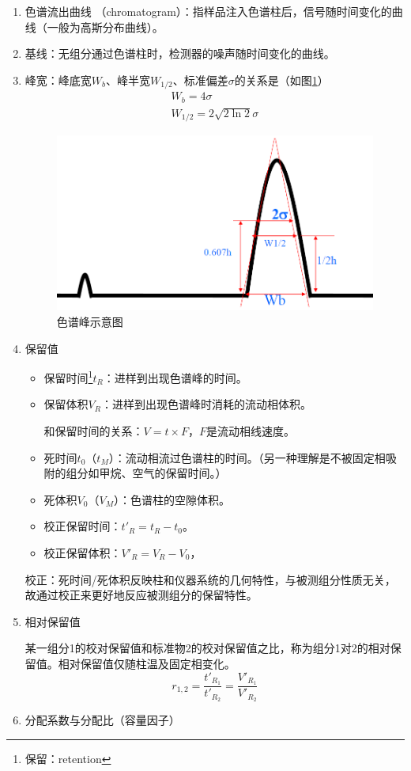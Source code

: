 \begin{enumerate}
	\item 色谱流出曲线 （chromatogram）：指样品注入色谱柱后，信号随时间变化的曲线（一般为高斯分布曲线）。
	\item 基线：无组分通过色谱柱时，检测器的噪声随时间变化的曲线。
	\item 峰宽：峰底宽$W_b$、峰半宽$W_{1/2}$、标准偏差$\sigma$的关系是（如图\ref{fig:chp1peak}）
	\begin{gather*}
		W_b=4\sigma\\
		W_{1/2}=2\sqrt{2\ln 2}\sigma
	\end{gather*}
	\begin{figure}[!h]
		\centering
		\includegraphics[width=0.55\linewidth]{image/chp1_peak}
		\caption{色谱峰示意图}
		\label{fig:chp1peak}
	\end{figure}
	\item 保留值
	\begin{itemize}
		\item 保留时间\footnote{保留：retention}$t_R$：进样到出现色谱峰的时间。
		\item 保留体积$V_R$：进样到出现色谱峰时消耗的流动相体积。
		
		和保留时间的关系：$V=t\times F$，$F$是流动相线速度。
		\item 死时间$t_0$（$t_M$）：流动相流过色谱柱的时间。（另一种理解是不被固定相吸附的组分如甲烷、空气的保留时间。）
		\item 死体积$V_0$（$V_M$）：色谱柱的空隙体积。
		\item 校正保留时间：$t'_R=t_R- t_0$。
		\item 校正保留体积：$V'_R=V_R- V_0$，
	\end{itemize}
		
	校正：死时间/死体积反映柱和仪器系统的几何特性，与被测组分性质无关，故通过校正来更好地反应被测组分的保留特性。
	\item 相对保留值
	
	某一组分1的校对保留值和标准物2的校对保留值之比，称为组分1对2的相对保留值。相对保留值仅随柱温及固定相变化。
	\begin{equation*}
	r_{1,2}=\dfrac{t'_{R_1}}{t'_{R_2}}=\dfrac{V'_{R_1}}{V'_{R_2}}
	\end{equation*}
	\item 分配系数与分配比（容量因子）
	

\end{enumerate}
